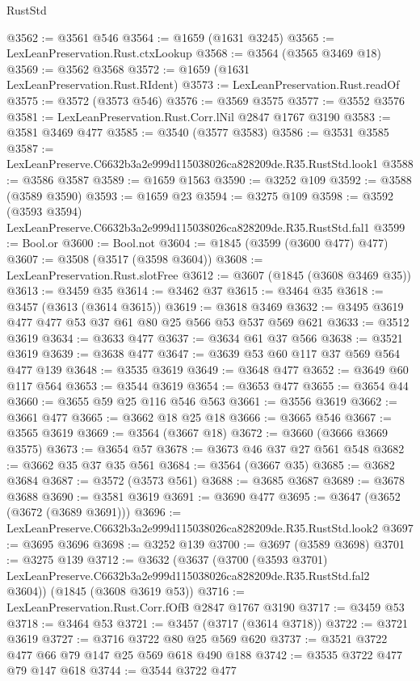 \begin{lexlean}{RustStd}
\begin{coremodule}
@3562 := @3561 @546
@3564 := @1659 (@1631 @3245)
@3565 := LexLeanPreservation.Rust.ctxLookup
@3568 := @3564 (@3565 @3469 @18)
@3569 := @3562 @3568
@3572 := @1659 (@1631 LexLeanPreservation.Rust.RIdent)
@3573 := LexLeanPreservation.Rust.readOf
@3575 := @3572 (@3573 @546)
@3576 := @3569 @3575
@3577 := @3552 @3576
@3581 := LexLeanPreservation.Rust.Corr.lNil @2847 @1767 @3190
@3583 := @3581 @3469 @477
@3585 := @3540 (@3577 @3583)
@3586 := @3531 @3585
@3587 := LexLeanPreserve.C6632b3a2e999d115038026ca828209de.R35.RustStd.look1
@3588 := @3586 @3587
@3589 := @1659 @1563
@3590 := @3252 @109
@3592 := @3588 (@3589 @3590)
@3593 := @1659 @23
@3594 := @3275 @109
@3598 := @3592 (@3593 @3594) LexLeanPreserve.C6632b3a2e999d115038026ca828209de.R35.RustStd.fal1
@3599 := Bool.or
@3600 := Bool.not
@3604 := @1845 (@3599 (@3600 @477) @477)
@3607 := @3508 (@3517 (@3598 @3604))
@3608 := LexLeanPreservation.Rust.slotFree
@3612 := @3607 (@1845 (@3608 @3469 @35))
@3613 := @3459 @35
@3614 := @3462 @37
@3615 := @3464 @35
@3618 := @3457 (@3613 (@3614 @3615))
@3619 := @3618 @3469
@3632 := @3495 @3619 @477 @477 @53 @37 @61 @80 @25 @566 @53 @537 @569 @621
@3633 := @3512 @3619
@3634 := @3633 @477
@3637 := @3634 @61 @37 @566
@3638 := @3521 @3619
@3639 := @3638 @477
@3647 := @3639 @53 @60 @117 @37 @569 @564 @477 @139
@3648 := @3535 @3619
@3649 := @3648 @477
@3652 := @3649 @60 @117 @564
@3653 := @3544 @3619
@3654 := @3653 @477
@3655 := @3654 @44
@3660 := @3655 @59 @25 @116 @546 @563
@3661 := @3556 @3619
@3662 := @3661 @477
@3665 := @3662 @18 @25 @18
@3666 := @3665 @546
@3667 := @3565 @3619
@3669 := @3564 (@3667 @18)
@3672 := @3660 (@3666 @3669 @3575)
@3673 := @3654 @57
@3678 := @3673 @46 @37 @27 @561 @548
@3682 := @3662 @35 @37 @35 @561
@3684 := @3564 (@3667 @35)
@3685 := @3682 @3684
@3687 := @3572 (@3573 @561)
@3688 := @3685 @3687
@3689 := @3678 @3688
@3690 := @3581 @3619
@3691 := @3690 @477
@3695 := @3647 (@3652 (@3672 (@3689 @3691)))
@3696 := LexLeanPreserve.C6632b3a2e999d115038026ca828209de.R35.RustStd.look2
@3697 := @3695 @3696
@3698 := @3252 @139
@3700 := @3697 (@3589 @3698)
@3701 := @3275 @139
@3712 := @3632
    (@3637
      (@3700
        (@3593 @3701)
        LexLeanPreserve.C6632b3a2e999d115038026ca828209de.R35.RustStd.fal2
        @3604))
    (@1845 (@3608 @3619 @53))
@3716 := LexLeanPreservation.Rust.Corr.fOfB @2847 @1767 @3190
@3717 := @3459 @53
@3718 := @3464 @53
@3721 := @3457 (@3717 (@3614 @3718))
@3722 := @3721 @3619
@3727 := @3716 @3722 @80 @25 @569 @620
@3737 := @3521 @3722 @477 @66 @79 @147 @25 @569 @618 @490 @188
@3742 := @3535 @3722 @477 @79 @147 @618
@3744 := @3544 @3722 @477

\end{coremodule}
\end{lexlean}
